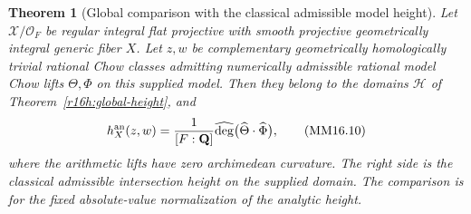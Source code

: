 \documentclass[11pt,a4paper]{article}
\newtheorem{theorem}{Theorem}[section]
\theoremstyle{definition}
\theoremstyle{remark}
\numberwithin{equation}{section}
\begin{document}
\begin{theorem}[Global comparison with the classical admissible model height]
\label{r16mm:global}
Let $\mathcal X/\mathcal O_F$ be regular integral flat projective
with smooth projective geometrically integral generic fiber $X$.
Let $z,w$ be complementary geometrically homologically trivial
rational Chow classes admitting numerically admissible rational
model Chow lifts $\Theta,\Phi$ on this supplied model. Then
they belong to the domains $\mathcal H$ of
Theorem~\ref{r16h:global-height}, and
\[
 h_X^{\rm an}(z,w)=\frac1{[F:\mathbf Q]}
                \widehat{\deg}\bigl(\widehat\Theta\cdot\widehat\Phi\bigr),
 \tag{MM16.10}\label{r16mm:global-eq}
\]
where the arithmetic lifts have zero archimedean curvature.
The right side is the classical admissible intersection height
on the supplied domain. The comparison is for the fixed
absolute-value normalization of the analytic height.
\end{theorem}
\end{document}
